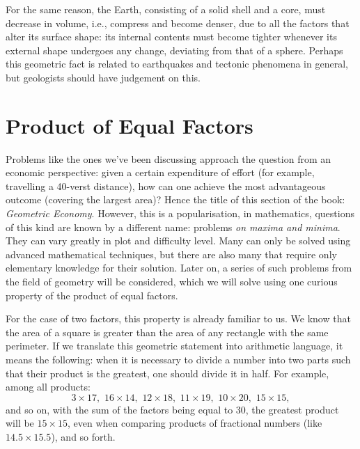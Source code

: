 For the same reason, the Earth, consisting of a solid shell and a core, must decrease in volume, i.e., compress and become denser, due to all the factors that alter its surface shape: its internal contents must become tighter whenever its external shape undergoes any change, deviating from that of a sphere. Perhaps this geometric fact is related to earthquakes and tectonic phenomena in general, but geologists should have judgement on this.

\section{Product of Equal Factors}
\label{sec-12.9}



Problems like the ones we've been discussing approach the question from an economic perspective: given a certain expenditure of effort (for example, travelling a 40-verst distance), how can one achieve the most advantageous outcome (covering the largest area)? Hence the title of this section of the book: \emph{Geometric Economy}. However, this is a popularisation, in mathematics, questions of this kind are known by a different name: problems \emph{on maxima and minima}. They can vary greatly in plot and difficulty level. Many can only be solved using advanced mathematical techniques, but there are also many that require only elementary knowledge for their solution. Later on, a series of such problems from the field of geometry will be considered, which we will solve using one curious property of the product of equal factors.

For the case of two factors, this property is already familiar to us. We know that the area of a square is greater than the area of any rectangle with the same perimeter. If we translate this geometric statement into arithmetic language, it means the following: when it is necessary to divide a number into two parts such that their product is the greatest, one should divide it in half. For example, among all products:
\begin{equation*}%
3 \times 17, \,\,  16 \times 14,\,\,  12 \times 18, \,\, 11 \times 19, \,\,  10 \times 20, \,\,  15 \times 15,
\end{equation*}
and so on, with the sum of the factors being equal to 30, the greatest product will be $15 \times 15$, even when comparing products of fractional numbers (like $14.5 \times 15.5$), and so forth.


